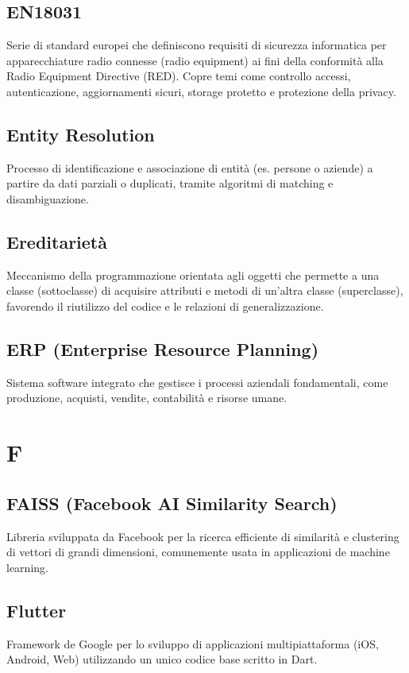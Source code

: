 \documentclass[a4paper,11pt]{article}
\begin{document}
\subsection{EN18031}
Serie di standard europei che definiscono requisiti di sicurezza informatica per apparecchiature radio connesse (radio equipment) ai fini della conformità alla Radio Equipment Directive (RED). Copre temi come controllo accessi, autenticazione, aggiornamenti sicuri, storage protetto e protezione della privacy.

\subsection{Entity Resolution}
Processo di identificazione e associazione di entità (es. persone o aziende) a partire da dati parziali o duplicati, tramite algoritmi di matching e disambiguazione.

\subsection{Ereditarietà}
Meccanismo della programmazione orientata agli oggetti che permette a una classe (sottoclasse) di acquisire attributi e metodi di un'altra classe (superclasse), favorendo il riutilizzo del codice e le relazioni di generalizzazione.

\subsection{ERP (Enterprise Resource Planning)}
Sistema software integrato che gestisce i processi aziendali fondamentali, come produzione, acquisti, vendite, contabilità e risorse umane.

\newpage
\section{F}

\subsection{FAISS (Facebook AI Similarity Search)}
Libreria sviluppata da Facebook per la ricerca efficiente di similarità e clustering di vettori di grandi dimensioni, comunemente usata in applicazioni de machine learning.

\subsection{Flutter}
Framework de Google per lo sviluppo di applicazioni multipiattaforma (iOS, Android, Web) utilizzando un unico codice base scritto in Dart.
\end{document}
